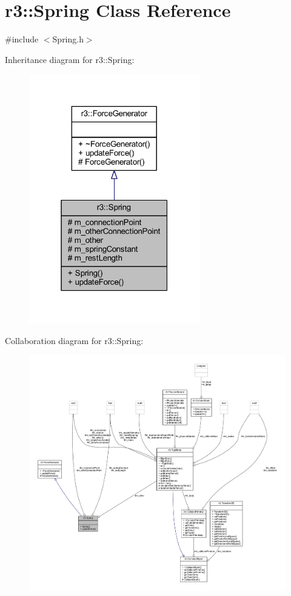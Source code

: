 \hypertarget{classr3_1_1_spring}{}\section{r3\+:\+:Spring Class Reference}
\label{classr3_1_1_spring}


{\ttfamily \#include $<$Spring.\+h$>$}



Inheritance diagram for r3\+:\+:Spring\+:\nopagebreak
\begin{figure}[H]
\begin{center}
\leavevmode
\includegraphics[width=211pt]{classr3_1_1_spring__inherit__graph}
\end{center}
\end{figure}


Collaboration diagram for r3\+:\+:Spring\+:\nopagebreak
\begin{figure}[H]
\begin{center}
\leavevmode
\includegraphics[width=350pt]{classr3_1_1_spring__coll__graph}
\end{center}
\end{figure}
